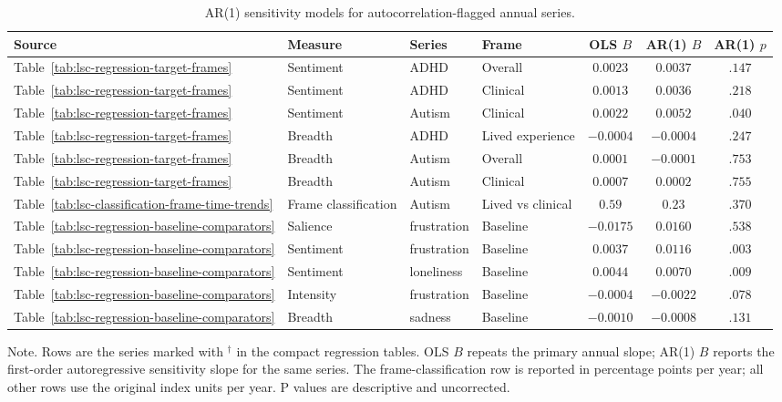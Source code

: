 \begin{table}[htbp]
\centering
\caption{AR(1) sensitivity models for autocorrelation-flagged annual series.}
\label{tab:lsc-ar1-sensitivity-flagged}
\scriptsize
\begin{tabular}{@{}llllccc@{}}
\toprule
Source & Measure & Series & Frame & OLS $B$ & AR(1) $B$ & AR(1) $p$ \\
\midrule
Table~\ref{tab:lsc-regression-target-frames} & Sentiment & ADHD & Overall & $0.0023$ & $0.0037$ & $.147$ \\
Table~\ref{tab:lsc-regression-target-frames} & Sentiment & ADHD & Clinical & $0.0013$ & $0.0036$ & $.218$ \\
Table~\ref{tab:lsc-regression-target-frames} & Sentiment & Autism & Clinical & $0.0022$ & $0.0052$ & $.040$ \\
Table~\ref{tab:lsc-regression-target-frames} & Breadth & ADHD & Lived experience & $-0.0004$ & $-0.0004$ & $.247$ \\
Table~\ref{tab:lsc-regression-target-frames} & Breadth & Autism & Overall & $0.0001$ & $-0.0001$ & $.753$ \\
Table~\ref{tab:lsc-regression-target-frames} & Breadth & Autism & Clinical & $0.0007$ & $0.0002$ & $.755$ \\
Table~\ref{tab:lsc-classification-frame-time-trends} & Frame classification & Autism & Lived vs clinical & $0.59$ & $0.23$ & $.370$ \\
Table~\ref{tab:lsc-regression-baseline-comparators} & Salience & frustration & Baseline & $-0.0175$ & $0.0160$ & $.538$ \\
Table~\ref{tab:lsc-regression-baseline-comparators} & Sentiment & frustration & Baseline & $0.0037$ & $0.0116$ & $.003$ \\
Table~\ref{tab:lsc-regression-baseline-comparators} & Sentiment & loneliness & Baseline & $0.0044$ & $0.0070$ & $.009$ \\
Table~\ref{tab:lsc-regression-baseline-comparators} & Intensity & frustration & Baseline & $-0.0004$ & $-0.0022$ & $.078$ \\
Table~\ref{tab:lsc-regression-baseline-comparators} & Breadth & sadness & Baseline & $-0.0010$ & $-0.0008$ & $.131$ \\
\bottomrule
\end{tabular}
\parbox{\linewidth}{\footnotesize Note. Rows are the series marked with $^{\dagger}$ in the compact regression tables. OLS $B$ repeats the primary annual slope; AR(1) $B$ reports the first-order autoregressive sensitivity slope for the same series. The frame-classification row is reported in percentage points per year; all other rows use the original index units per year. P values are descriptive and uncorrected.}
\end{table}
